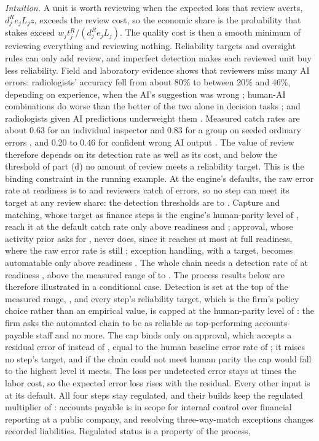 \noindent\emph{Intuition.} A unit is worth reviewing when the expected loss that review averts, $d^R_je_jL_jz$, exceeds the review cost, so the economic share is the probability that stakes exceed $w_jt^R_j/(d^R_je_jL_j)$. The quality cost is then a smooth minimum of reviewing everything and reviewing nothing. Reliability targets and oversight rules can only add review, and imperfect detection makes each reviewed unit buy less reliability. Field and laboratory evidence shows that reviewers miss many AI errors: radiologists' accuracy fell from about 80\% to between 20\% and 46\%, depending on experience, when the AI's suggestion was wrong \citep{dratsch2023automation}; human-AI combinations do worse than the better of the two alone in decision tasks \citep{vaccaro2024when}; and radiologists given AI predictions underweight them \citep{agarwal2023combining}. Measured catch rates are about 0.63 for an individual inspector and 0.83 for a group on seeded ordinary errors \citep{panko1999applying}, and 0.20 to 0.46 for confident wrong AI output \citep{si2024large,dratsch2023automation}. The value of review therefore depends on its detection rate as well as its cost, and below the threshold of part (d) no amount of review meets a reliability target. This is the binding constraint in the running example. At the engine's defaults, the raw error rate at readiness \icIotaHigh{} is \icEhighMin{} to \icEhighMax{} and reviewers catch \icDR{} of errors, so no step can meet its target at any review share: the detection thresholds are \icDstarMin{} to \icDstarMax. Capture and matching, whose target as finance steps is the engine's human-parity level of \icQbarHigh, reach it at the default catch rate only above readiness \icCaptureIotaFeas{} and \icMatchIotaFeas; approval, whose activity prior asks for \icQbarAppr, never does, since it reaches at most \icMaxRelApprFull{} at full readiness, where the raw error rate is still \icEfullMin; exception handling, with a \icQbarExc{} target, becomes automatable only above readiness \icExcIotaFeas. The whole chain needs a detection rate of \icDfeas{} at readiness \icIotaHigh, above the measured range of \icDRlow{} to \icDRhigh. The process results below are therefore illustrated in a conditional case. Detection is set at the top of the measured range, \icDill, and every step's reliability target, which is the firm's policy choice rather than an empirical value, is capped at the human-parity level of \icQbarHigh: the firm asks the automated chain to be as reliable as top-performing accounts-payable staff and no more. The cap binds only on approval, which accepts a residual error of \icResidCap{} instead of \icResidAppr, equal to the human baseline error rate of \icEHuman; it raises no step's target, and if the chain could not meet human parity the cap would fall to the highest level it meets. The loss per undetected error stays at \icLmultReg{} times the labor cost, so the expected error loss rises with the residual. Every other input is at its default. All four steps stay regulated, and their builds keep the regulated multiplier of \icRegMult: accounts payable is in scope for internal control over financial reporting at a public company, and resolving three-way-match exceptions changes recorded liabilities. Regulated status is a property of the process, 